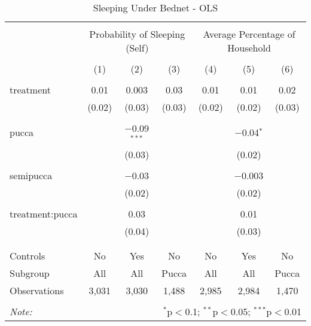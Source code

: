 
\begin{table}[!htbp] \centering 
  \caption{Sleeping Under Bednet - OLS} 
  \label{tbl:Sleeping Under Bednet - OLS} 
\begin{tabular}{@{\extracolsep{5pt}}lcccccc} 
\\[-1.8ex]\hline 
\hline \\[-1.8ex] 
 & \multicolumn{3}{c}{Probability of Sleeping (Self)} & \multicolumn{3}{c}{Average Percentage of Household} \\ 
\\[-1.8ex] & (1) & (2) & (3) & (4) & (5) & (6)\\ 
\hline \\[-1.8ex] 
 treatment & 0.01 & 0.003 & 0.03 & 0.01 & 0.01 & 0.02 \\ 
  & (0.02) & (0.03) & (0.03) & (0.02) & (0.02) & (0.03) \\ 
  & & & & & & \\ 
 pucca &  & $-$0.09$^{***}$ &  &  & $-$0.04$^{*}$ &  \\ 
  &  & (0.03) &  &  & (0.02) &  \\ 
  & & & & & & \\ 
 semipucca &  & $-$0.03 &  &  & $-$0.003 &  \\ 
  &  & (0.02) &  &  & (0.02) &  \\ 
  & & & & & & \\ 
 treatment:pucca &  & 0.03 &  &  & 0.01 &  \\ 
  &  & (0.04) &  &  & (0.03) &  \\ 
  & & & & & & \\ 
\hline \\[-1.8ex] 
Controls & No & Yes & No & No & Yes & No \\ 
Subgroup & All & All & Pucca & All & All & Pucca \\ 
Observations & 3,031 & 3,030 & 1,488 & 2,985 & 2,984 & 1,470 \\ 
\hline 
\hline \\[-1.8ex] 
\textit{Note:}  & \multicolumn{6}{r}{$^{*}$p$<$0.1; $^{**}$p$<$0.05; $^{***}$p$<$0.01} \\ 
\end{tabular} 
\end{table} 
